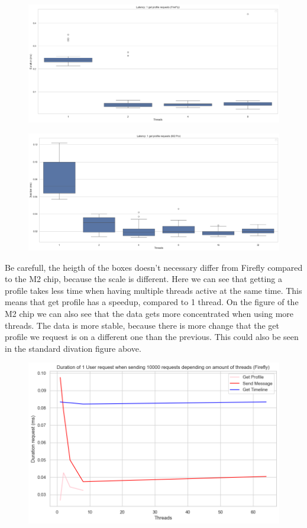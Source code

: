 \documentclass[a4paper]{article}
\begin{document}
\begin{figure}[H]
	\centering
	\includegraphics[width = \linewidth]{Images/LatencyBoxFirefly.png}
	\caption{}
\end{figure}
\begin{figure}[H]
	\centering
	\includegraphics[width = \linewidth]{Images/LatencyBox.png}
	\caption{}
\end{figure}
Be carefull, the heigth of the boxes doesn't necessary differ from Firefly compared to the M2 chip, because the scale is different. Here we can see that getting a profile takes less time when having multiple threads active at the same time. This means that get profile has a speedup, compared to 1 thread. On the figure of the M2 chip we can also see that the data gets more concentrated when using more threads. The data is more stable, because there is more change that the get profile we request is on a different one than the previous. This could also be seen in the standard divation figure above.  
\begin{figure}[H]
	\centering
	\includegraphics[width = \linewidth]{Images/LatencyFirefly.png}
	\caption{}
\end{figure}
\end{document}
